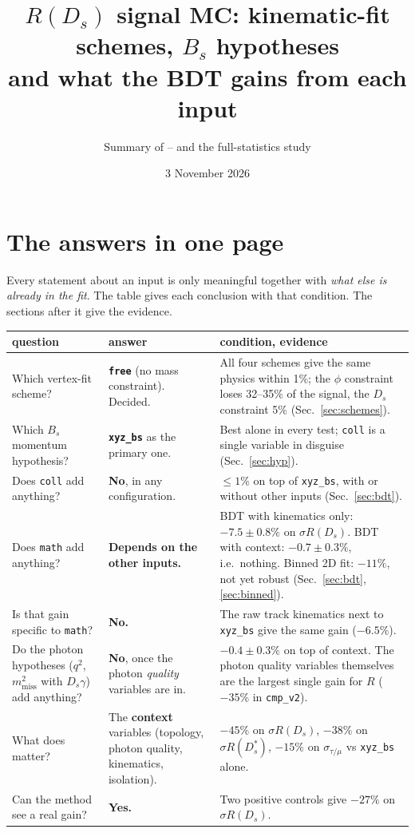 \documentclass[10pt,a4paper]{article}
\title{$R(D_s)$ signal MC: kinematic-fit schemes, $B_s$ hypotheses\\ and what the BDT gains from each input}
\author{Summary of \code{compare\_fits} \code{cmp\_v1}--\code{cmp\_v3} and the full-statistics \code{hypinfo} study}
\date{3 November 2026}
\newcommand{\code}[1]{\texttt{#1}}
\newcommand{\Ds}{D_s}
\newcommand{\Dss}{D_s^*}
\newcommand{\mm}{m^2_\text{miss}}
\newcommand{\sR}{\sigma R}
\begin{document}
\maketitle

\section*{The answers in one page}

Every statement about an input is only meaningful together with \emph{what else is already in the fit}. The table
gives each conclusion with that condition. The sections after it give the evidence.

\begin{center}
\small
\begin{tabular}{>{\raggedright\arraybackslash}p{}>{\raggedright\arraybackslash}p{}>{\raggedright\arraybackslash}p{}}
\toprule
question & answer & condition, evidence \\
\midrule
Which vertex-fit scheme? & \textbf{\code{free}} (no mass constraint). Decided. &
  All four schemes give the same physics within 1\%; the $\phi$ constraint loses 32--35\% of the signal, the
  $\Ds$ constraint 5\% (Sec.~\ref{sec:schemes}). \\
\addlinespace
Which $B_s$ momentum hypothesis? & \textbf{\code{xyz\_bs}} as the primary one. &
  Best alone in every test; \code{coll} is a single variable in disguise (Sec.~\ref{sec:hyp}). \\
\addlinespace
Does \code{coll} add anything? & \textbf{No}, in any configuration. &
  $\le1\%$ on top of \code{xyz\_bs}, with or without other inputs (Sec.~\ref{sec:bdt}). \\
\addlinespace
Does \code{math} add anything? & \textbf{Depends on the other inputs.} &
  BDT with kinematics only: $-7.5\pm0.8\%$ on $\sR(\Ds)$. BDT with context: $-0.7\pm0.3\%$, i.e.\ nothing. Binned
  2D fit: $-11\%$, not yet robust (Sec.~\ref{sec:bdt}, \ref{sec:binned}). \\
\addlinespace
Is that gain specific to \code{math}? & \textbf{No.} &
  The raw track kinematics next to \code{xyz\_bs} give the same gain ($-6.5\%$). \\
\addlinespace
Do the photon hypotheses ($q^2$, $\mm$ with $\Ds\gamma$) add anything? & \textbf{No}, once the photon
  \emph{quality} variables are in. & $-0.4\pm0.3\%$ on top of context. The photon quality variables themselves are
  the largest single gain for $R$ ($-35\%$ in \code{cmp\_v2}). \\
\addlinespace
What does matter? & The \textbf{context} variables (topology, photon quality, kinematics, isolation). &
  $-45\%$ on $\sR(\Ds)$, $-38\%$ on $\sR(\Dss)$, $-15\%$ on $\sigma_{\tau/\mu}$ vs \code{xyz\_bs} alone. \\
\addlinespace
Can the method see a real gain? & \textbf{Yes.} & Two positive controls give $-27\%$ on $\sR(\Ds)$. \\
\bottomrule
\end{tabular}
\end{center}
\end{document}
